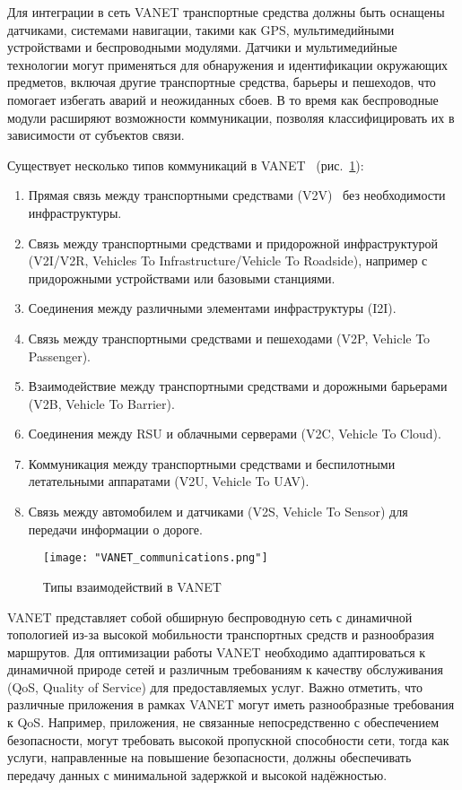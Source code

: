 Для интеграции в сеть VANET транспортные средства должны быть оснащены датчиками, системами навигации, такими как GPS, мультимедийными устройствами и беспроводными модулями. Датчики и мультимедийные технологии могут применяться для обнаружения и идентификации окружающих предметов, включая другие транспортные средства, барьеры и пешеходов, что помогает избегать аварий и неожиданных сбоев. В то время как беспроводные модули расширяют возможности коммуникации, позволяя классифицировать их в зависимости от субъектов связи.

Существует несколько типов коммуникаций в VANET~\cite{daniel2016cooperative} (рис.~\ref{fig:vanet_communications}):
\begin{enumerate}
    \item Прямая связь между транспортными средствами (V2V)~\cite{bintoro2021study} без необходимости инфраструктуры.
    \item Связь между транспортными средствами и придорожной инфраструктурой (V2I/V2R, Vehicles To Infrastructure/Vehicle To Roadside), например с придорожными устройствами или базовыми станциями.
    \item Соединения между различными элементами инфраструктуры (I2I).
    \item Связь между транспортными средствами и пешеходами (V2P, Vehicle To Passenger).
    \item Взаимодействие между транспортными средствами и дорожными барьерами (V2B, Vehicle To Barrier).
    \item Соединения между RSU и облачными серверами (V2C, Vehicle To Cloud).
    \item Коммуникация между транспортными средствами и беспилотными летательными аппаратами (V2U, Vehicle To UAV).
    \item Связь между автомобилем и датчиками (V2S, Vehicle To Sensor) для передачи информации о дороге.
\end{enumerate}

\begin{figure}[!h]
    \centering
    \texttt{[image: "VANET\_communications.png"]}
    \caption{Типы взаимодействий в VANET}
    \label{fig:vanet_communications}
\end{figure}

VANET представляет собой обширную беспроводную сеть с динамичной топологией из-за высокой мобильности транспортных средств и разнообразия маршрутов. Для оптимизации работы VANET необходимо адаптироваться к динамичной природе сетей и различным требованиям к качеству обслуживания (QoS, Quality of Service) для предоставляемых услуг. Важно отметить, что различные приложения в рамках VANET могут иметь разнообразные требования к QoS. Например, приложения, не связанные непосредственно с обеспечением безопасности, могут требовать высокой пропускной способности сети, тогда как услуги, направленные на повышение безопасности, должны обеспечивать передачу данных с минимальной задержкой и высокой надёжностью.

